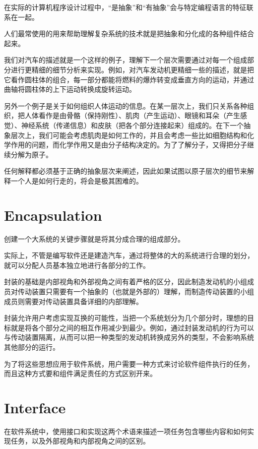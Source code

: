 在实际的计算机程序设计过程中，“是抽象”和“有抽象”会与特定编程语言的特征联系在一起。

人们最常使用的用来帮助理解复杂系统的技术就是把抽象和分化成的各种组件结合起来。

我们对汽车的描述就是一个这样的例子，理解下一个层次需要通过对每一个组成部分进行更精细的细节分析来实现。例如，对汽车发动机更精细一些的描述，就是把它看作圆柱体的组合，每一部分都能将燃料的爆炸转变成垂直方向的运动，并通过曲轴将圆柱体的上下运动转换成旋转运动。

另外一个例子是关于如何组织人体运动的信息。在某一层次上，我们只关系各种组织，把人体看作是由骨骼（保持刚性）、肌肉（产生运动）、眼镜和耳朵（产生感觉）、神经系统（传递信息）和皮肤（把各个部分连接起来）组成的。在下一个抽象层次上，我们可能会考虑肌肉是如何工作的，并且会考虑一些比如细胞结构和化学作用的问题，而化学作用又是由分子结构决定的。为了了解分子，又得把分子继续分解为原子。

任何解释都必须基于正确的抽象层次来阐述，因此如果试图以原子层次的细节来解释一个人是如何行走的，将会是极其困难的。


\section{Encapsulation}


创建一个大系统的关键步骤就是将其分成合理的组成部分。

实际上，不管是编写软件还是建造汽车，通过将整体的大的系统进行合理的划分，就可以分配人员基本独立地进行各部分的工作。



封装的基础是内部视角和外部视角之间有着严格的区分，因此制造发动机的小组成员对传动装置只需要有一个抽象的（也就是外部的）理解，而制造传动装置的小组成员则需要对传动装置具备详细的内部理解。

封装允许用户考虑实现互换的可能性，当把一个系统划分为几个部分时，理想的目标就是将各个部分之间的相互作用减少到最少。例如，通过封装发动机的行为可以与传动装置隔离，从而可以把一种类型的发动机转换成另外的类型，不会影响系统其他部分的运行。

为了将这些思想应用于软件系统，用户需要一种方式来讨论软件组件执行的任务，而且这种方式要和组件满足责任的方式区别开来。


\section{Interface}

在软件系统中，使用接口和实现这两个术语来描述一项任务包含哪些内容和如何实现任务，以及外部视角和内部视角之间的区别。

